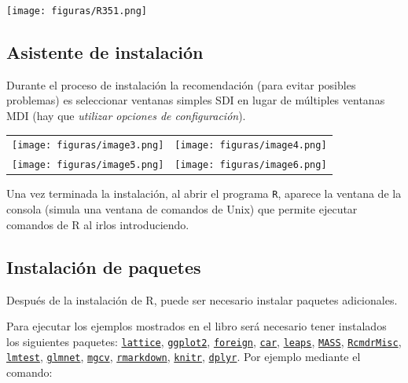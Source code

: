 \documentclass[
]{book}
\theoremstyle{break}
\begin{document}
\texttt{[image: figuras/R351.png]}

\hypertarget{asistente-de-instalaciuxf3n}{%
\subsection{Asistente de instalación}\label{asistente-de-instalaciuxf3n}}

Durante el proceso de instalación la recomendación (para evitar posibles
problemas) es seleccionar ventanas simples SDI en lugar de múltiples
ventanas MDI (hay que \emph{utilizar opciones de configuración}).

\begin{longtable}[]{@{}cc@{}}
\toprule
\endhead
\texttt{[image: figuras/image3.png]} & \texttt{[image: figuras/image4.png]} \\
\texttt{[image: figuras/image5.png]} & \texttt{[image: figuras/image6.png]} \\
\bottomrule
\end{longtable}

Una vez terminada la instalación, al abrir el programa \texttt{R}, aparece la
ventana de la consola (simula una ventana de comandos de Unix) que permite
ejecutar comandos de R al irlos introduciendo.

\hypertarget{instalaciuxf3n-de-paquetes}{%
\subsection{Instalación de paquetes}\label{instalaciuxf3n-de-paquetes}}

Después de la instalación de R, puede ser necesario instalar paquetes
adicionales.

Para ejecutar los ejemplos mostrados en el libro será necesario tener instalados los siguientes paquetes:
\href{https://cran.r-project.org/web/packages/lattice/index.html}{\texttt{lattice}},
\href{https://cran.r-project.org/web/packages/ggplot2/index.html}{\texttt{ggplot2}},
\href{https://cran.r-project.org/web/packages/foreign/index.html}{\texttt{foreign}},
\href{https://cran.r-project.org/web/packages/car/index.html}{\texttt{car}},
\href{https://cran.r-project.org/web/packages/leaps/index.html}{\texttt{leaps}},
\href{https://cran.r-project.org/web/packages/MASS/index.html}{\texttt{MASS}},
\href{https://cran.r-project.org/web/packages/RcmdrMisc/index.html}{\texttt{RcmdrMisc}},
\href{https://cran.r-project.org/web/packages/lmtest/index.html}{\texttt{lmtest}},
\href{https://cran.r-project.org/web/packages/glmnet/index.html}{\texttt{glmnet}},
\href{https://cran.r-project.org/web/packages/mgcv/index.html}{\texttt{mgcv}},
\href{https://cran.r-project.org/web/packages/rmarkdown/index.html}{\texttt{rmarkdown}},
\href{https://cran.r-project.org/web/packages/knitr/index.html}{\texttt{knitr}},
\href{https://cran.r-project.org/web/packages/dplyr/index.html}{\texttt{dplyr}}.
Por ejemplo mediante el comando:
\end{document}
